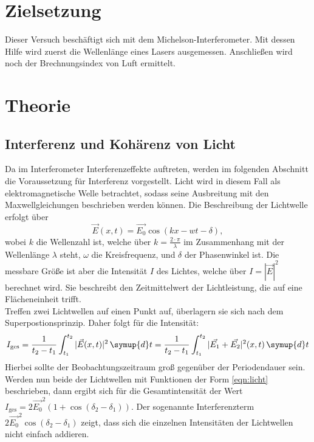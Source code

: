 \section{Zielsetzung}
\label{sec:Zielsetzung}
Dieser Versuch beschäftigt sich mit dem Michelson-Interferometer.
Mit dessen Hilfe wird zuerst die Wellenlänge eines Lasers ausgemessen.
Anschließen wird noch der Brechnungsindex von Luft ermittelt.


\section{Theorie}
\label{sec:Theorie}

\subsection{Interferenz und Kohärenz von Licht}

Da im Interferometer Interferenzeffekte auftreten, werden im folgenden Abschnitt die Voraussetzung für Interferenz vorgestellt.
Licht wird in diesem Fall als elektromagnetische Welle betrachtet, sodass seine Ausbreitung mit den Maxwellgleichungen beschrieben werden können. Die Beschreibung der 
Lichtwelle erfolgt über
\begin{equation}\label{eqn:licht}
    \vec{E}(x,t) = \vec{E_0} \cos(kx-wt-\delta),
\end{equation}
wobei $k$ die Wellenzahl ist, welche über $k=\frac{2\cdot \pi}{\lambda}$ im Zusammenhang mit der Wellenlänge $\lambda$ steht, $\omega$ die Kreisfrequenz, und 
$\delta$ der Phasenwinkel ist. Die messbare Größe ist aber die Intensität $I$ des Lichtes, welche über $I = |\vec{E}|^2$  berechnet wird. Sie beschreibt den Zeitmittelwert der
Lichtleistung, die auf eine Flächeneinheit trifft. \\
Treffen zwei Lichtwellen auf einen Punkt auf, überlagern sie sich nach dem Superpostionsprinzip. Daher folgt für die Intensität:
\begin{equation*}
    I_{\text{ges}} = \frac{1}{t_2 - t_1} \int_{t_1}^{t_2} | \vec{E}(x,t)|^2 \, \symup{d}t  = \frac{1}{t_2 - t_1} \int_{t_1}^{t_2} | \vec{E_1}+ \vec{E_2}|^2 (x,t) \, \symup{d}t
\end{equation*}
Hierbei sollte der Beobachtungszeitraum groß gegenüber der Periodendauer sein. 
Werden nun beide der Lichtwellen mit Funktionen der Form \eqref{eqn:licht} beschrieben, dann ergibt sich für die Gesamtintensität der Wert $I_{\text{ges}} = 2 \vec{E_0}^2 (1+\cos(\delta_2 - \delta_1))$.
Der sogenannte Interferenzterm $2\vec{E_0}^2 \cos(\delta_2 - \delta_1)$ zeigt, dass sich die einzelnen Intensitäten der Lichtwellen nicht einfach addieren.\\

